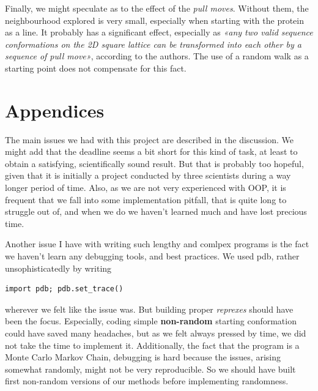 \documentclass[a4paper, 12pt]{article}
\begin{document}
Finally, we might speculate as to the effect of the \emph{pull moves}. Without them, the neighbourhood explored is very small, especially when starting with the protein as a line. It probably has a significant effect, especially as \emph{«any two valid sequence conformations on the 2D square lattice can be transformed into each other by a sequence of pull move»}, according to the authors. The use of a random walk as a starting point does not compensate for this fact.

\clearpage
\section*{Appendices}
\label{sec:orgd4ac2f7}
The main issues we had with this project are described in the discussion. We might add that the deadline seems a bit short for this kind of task, at least to obtain a satisfying, scientifically sound result. But that is probably too hopeful, given that it is initially a project conducted by three scientists during a way longer period of time. Also, as we are not very experienced with OOP, it is frequent that we fall into some implementation pitfall, that is quite long to struggle out of, and when we do we haven't learned much and have lost precious time.

Another issue I have with writing such lengthy and comlpex programs is the fact we haven't learn any debugging tools, and best practices. We used pdb, rather unsophisticatedly by writing
\begin{verbatim}
import pdb; pdb.set_trace()
\end{verbatim}

wherever we felt like the issue was. But building proper \emph{reprexes} should have been the focus. Especially, coding simple \textbf{non-random} starting conformation could have saved many headaches, but as we felt always pressed by time, we did not take the time to implement it. Additionally, the fact that the program is a Monte Carlo Markov Chain, debugging is hard because the issues, arising somewhat randomly, might not be very reproducible. So we should have built first non-random versions of our methods before implementing randomness.
\end{document}
